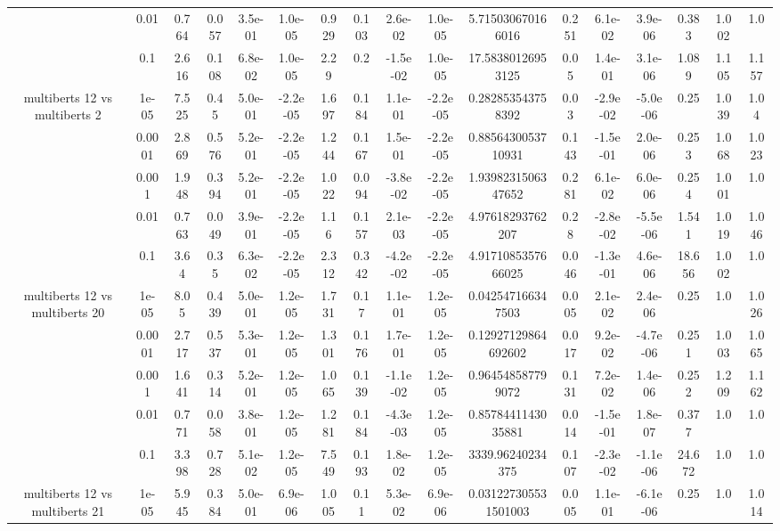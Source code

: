 \begin{tabular}{|c|c|c|c|c|c|c|c|c|c|c|c|c|c|c|c|c|}
 & 0.01 & 0.764 & 0.057 & 3.5e-01 & 1.0e-05 & 0.929 & 0.103 & 2.6e-02 & 1.0e-05 & 5.715030670166016 & 0.251 & 6.1e-02 & 3.9e-06 & 0.383 & 1.002 & 1.0 \\
 & 0.1 & 2.616 & 0.108 & 6.8e-02 & 1.0e-05 & 2.29 & 0.2 & -1.5e-02 & 1.0e-05 & 17.58380126953125 & 0.05 & 1.4e-01 & 3.1e-06 & 1.089 & 1.105 & 1.157 \\
\hline
\multirow{5}{*}{multiberts 12 vs multiberts 2} & 1e-05 & 7.525 & 0.45 & 5.0e-01 & -2.2e-05 & 1.697 & 0.184 & 1.1e-01 & -2.2e-05 & 0.282853543758392 & 0.03 & -2.9e-02 & -5.0e-06 & 0.25 & 1.039 & 1.04 \\
 & 0.0001 & 2.869 & 0.576 & 5.2e-01 & -2.2e-05 & 1.244 & 0.167 & 1.5e-01 & -2.2e-05 & 0.8856430053710931 & 0.143 & -1.5e-01 & 2.0e-06 & 0.253 & 1.068 & 1.023 \\
 & 0.001 & 1.948 & 0.394 & 5.2e-01 & -2.2e-05 & 1.022 & 0.094 & -3.8e-02 & -2.2e-05 & 1.9398231506347652 & 0.281 & 6.1e-02 & 6.0e-06 & 0.254 & 1.001 & 1.0 \\
 & 0.01 & 0.763 & 0.049 & 3.9e-01 & -2.2e-05 & 1.16 & 0.157 & 2.1e-03 & -2.2e-05 & 4.97618293762207 & 0.28 & -2.8e-02 & -5.5e-06 & 1.541 & 1.019 & 1.046 \\
 & 0.1 & 3.64 & 0.35 & 6.3e-02 & -2.2e-05 & 2.312 & 0.342 & -4.2e-02 & -2.2e-05 & 4.9171085357666025 & 0.046 & -1.3e-01 & 4.6e-06 & 18.656 & 1.002 & 1.0 \\
\hline
\multirow{5}{*}{multiberts 12 vs multiberts 20} & 1e-05 & 8.05 & 0.439 & 5.0e-01 & 1.2e-05 & 1.731 & 0.17 & 1.1e-01 & 1.2e-05 & 0.042547166347503 & 0.005 & 2.1e-02 & 2.4e-06 & 0.25 & 1.0 & 1.026 \\
 & 0.0001 & 2.717 & 0.537 & 5.3e-01 & 1.2e-05 & 1.301 & 0.176 & 1.7e-01 & 1.2e-05 & 0.12927129864692602 & 0.017 & 9.2e-02 & -4.7e-06 & 0.251 & 1.003 & 1.065 \\
 & 0.001 & 1.641 & 0.314 & 5.2e-01 & 1.2e-05 & 1.065 & 0.139 & -1.1e-02 & 1.2e-05 & 0.964548587799072 & 0.131 & 7.2e-02 & 1.4e-06 & 0.252 & 1.209 & 1.162 \\
 & 0.01 & 0.771 & 0.058 & 3.8e-01 & 1.2e-05 & 1.281 & 0.184 & -4.3e-03 & 1.2e-05 & 0.8578441143035881 & 0.014 & -1.5e-01 & 1.8e-07 & 0.377 & 1.0 & 1.0 \\
 & 0.1 & 3.398 & 0.728 & 5.1e-02 & 1.2e-05 & 7.549 & 0.193 & 1.8e-02 & 1.2e-05 & 3339.96240234375 & 0.107 & -2.3e-02 & -1.1e-06 & 24.672 & 1.0 & 1.0 \\
\hline
\multirow{5}{*}{multiberts 12 vs multiberts 21} & 1e-05 & 5.945 & 0.384 & 5.0e-01 & 6.9e-06 & 1.005 & 0.11 & 5.3e-02 & 6.9e-06 & 0.031227305531501003 & 0.005 & 1.1e-01 & -6.1e-06 & 0.25 & 1.0 & 1.014 \\

\end{tabular}
